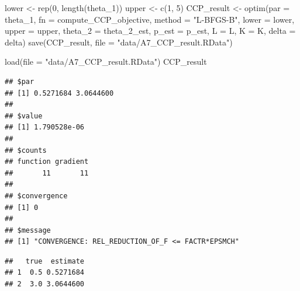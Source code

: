 \documentclass[
]{book}
\newenvironment{Shaded}{\begin{snugshade}}{\end{snugshade}}
\newcommand{\AttributeTok}[1]{\textcolor[rgb]{0.77,0.63,0.00}{#1}}
\newcommand{\DecValTok}[1]{\textcolor[rgb]{0.00,0.00,0.81}{#1}}
\newcommand{\FunctionTok}[1]{\textcolor[rgb]{0.00,0.00,0.00}{#1}}
\newcommand{\NormalTok}[1]{#1}
\newcommand{\OtherTok}[1]{\textcolor[rgb]{0.56,0.35,0.01}{#1}}
\newcommand{\SpecialCharTok}[1]{\textcolor[rgb]{0.00,0.00,0.00}{#1}}
\newcommand{\StringTok}[1]{\textcolor[rgb]{0.31,0.60,0.02}{#1}}
\begin{document}
\begin{Shaded}
\begin{Highlighting}[]
\NormalTok{lower }\OtherTok{\textless{}{-}} \FunctionTok{rep}\NormalTok{(}\DecValTok{0}\NormalTok{, }\FunctionTok{length}\NormalTok{(theta\_1))}
\NormalTok{upper }\OtherTok{\textless{}{-}} \FunctionTok{c}\NormalTok{(}\DecValTok{1}\NormalTok{, }\DecValTok{5}\NormalTok{)}
\NormalTok{CCP\_result }\OtherTok{\textless{}{-}}
  \FunctionTok{optim}\NormalTok{(}\AttributeTok{par =}\NormalTok{ theta\_1,}
        \AttributeTok{fn =}\NormalTok{ compute\_CCP\_objective,}
        \AttributeTok{method =} \StringTok{"L{-}BFGS{-}B"}\NormalTok{,}
        \AttributeTok{lower =}\NormalTok{ lower,}
        \AttributeTok{upper =}\NormalTok{ upper,}
        \AttributeTok{theta\_2 =}\NormalTok{ theta\_2\_est, }
        \AttributeTok{p\_est =}\NormalTok{ p\_est, }
        \AttributeTok{L =}\NormalTok{ L, }
        \AttributeTok{K =}\NormalTok{ K, }
        \AttributeTok{delta =}\NormalTok{ delta)}
\FunctionTok{save}\NormalTok{(CCP\_result, }\AttributeTok{file =} \StringTok{"data/A7\_CCP\_result.RData"}\NormalTok{)}
\end{Highlighting}
\end{Shaded}

\begin{Shaded}
\begin{Highlighting}[]
\FunctionTok{load}\NormalTok{(}\AttributeTok{file =} \StringTok{"data/A7\_CCP\_result.RData"}\NormalTok{)}
\NormalTok{CCP\_result}
\end{Highlighting}
\end{Shaded}

\begin{verbatim}
## $par
## [1] 0.5271684 3.0644600
## 
## $value
## [1] 1.790528e-06
## 
## $counts
## function gradient 
##       11       11 
## 
## $convergence
## [1] 0
## 
## $message
## [1] "CONVERGENCE: REL_REDUCTION_OF_F <= FACTR*EPSMCH"
\end{verbatim}

\begin{Shaded}
\end{Shaded}

\begin{verbatim}
##   true  estimate
## 1  0.5 0.5271684
## 2  3.0 3.0644600
\end{verbatim}
\end{document}
